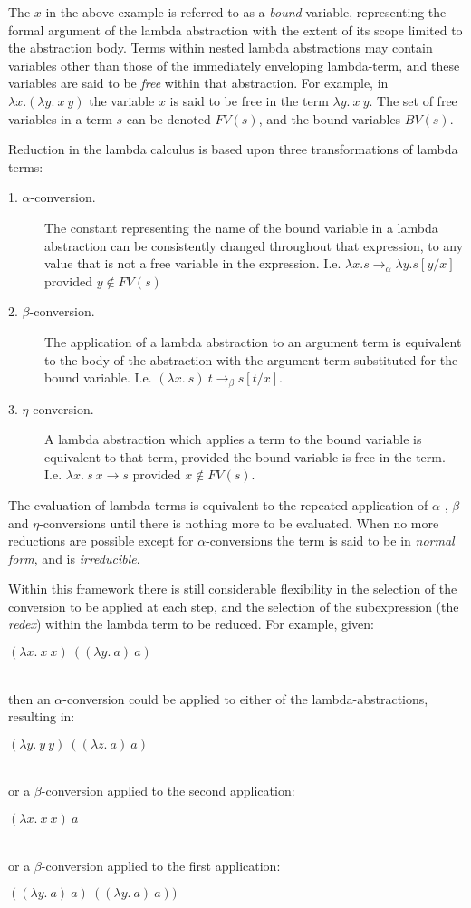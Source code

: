 The $x$ in the above example is referred to as a \textit{bound} variable, representing
the formal argument of the lambda abstraction with the extent of its scope limited to
the abstraction body.  Terms within nested lambda abstractions may contain variables
other than those of the immediately enveloping lambda-term, and these variables are
said to be \textit{free} within that abstraction.  For example, in
$\lambda x.( \lambda y.\ x\ y)$ the variable $x$ is said to be free in the term
$\lambda y.\ x\ y$.  The set of free variables in a term $s$ can be denoted $FV(s)$, and 
the bound variables $BV(s)$.

Reduction in the lambda calculus is based upon three transformations of lambda terms:
\begin{description}
\item[1. $\alpha$-conversion.]{The constant representing the name of the bound variable
  in a lambda abstraction can be consistently changed throughout that expression, to any
  value that is not a free variable in the expression.  I.e. $\lambda x. s \rightarrow_\alpha
  \lambda y.s[y/x]$ provided $y \not \in FV(s)$}
\item[2. $\beta$-conversion.]{The application of a lambda abstraction to an argument
  term is equivalent to the body of the abstraction with the argument term 
  substituted for the bound variable.  I.e. $(\lambda x.\ s)\ t \rightarrow_\beta
  s[t/x]$.}
\item[3. $\eta$-conversion.]{A lambda abstraction which applies a term to the bound
  variable is equivalent to that term,
  provided the bound variable is free in the term.  I.e. $\lambda x.\ s\ x \rightarrow s$
  provided $x \not \in FV(s)$.}
\end{description}

The evaluation of lambda terms is equivalent to the repeated application of 
$\alpha$-, $\beta$- and $\eta$-conversions until there is nothing more to be 
evaluated.  When no more reductions are possible except for $\alpha$-conversions
the term is said to be in \textit{normal form}, and is \textit{irreducible}.

Within this framework there is still considerable flexibility in the selection of
the conversion to be applied at each step, and the selection of the subexpression
(the \textit{redex}) within the lambda term to be reduced.  For example, given:\\
\centerline{$(\lambda x.\ x\ x)\ ((\lambda y.\ a)\ a)$}\\
then an $\alpha$-conversion could be applied to either of the lambda-abstractions,
resulting in:\\
\centerline{$(\lambda y.\ y\ y)\ ((\lambda z.\ a)\ a)$}\\
or a $\beta$-conversion applied to the second application:\\
\centerline{$(\lambda x.\ x\ x)\ a$}\\
or a $\beta$-conversion applied to the first application:\\
\centerline{$((\lambda y.\ a)\ a)\ ((\lambda y.\ a)\ a))$}

